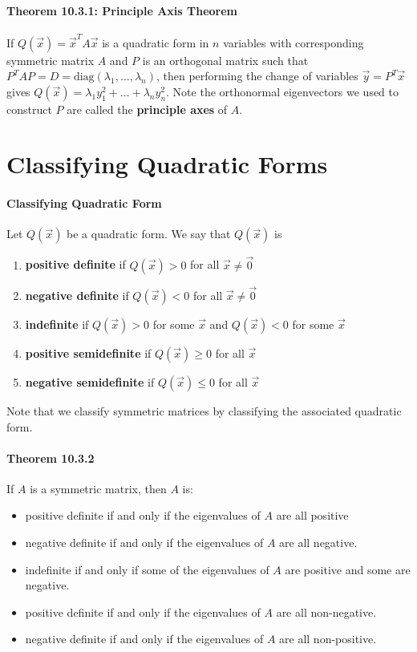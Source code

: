 \documentclass[10pt,letter]{article}
\begin{document}
\paragraph{Theorem 10.3.1: Principle Axis Theorem}
If $Q(\vec{x})=\vec{x}^TA\vec{x}$ is a quadratic form in $n$ variables with corresponding symmetric matrix $A$ and $P$ is an orthogonal matrix such that $P^TAP=D=\text{diag}(\lambda_1,\ldots,\lambda_n)$, then performing the change of variables $\vec{y}=P^T\vec{x}$ gives $Q(\vec{x})=\lambda_1y_1^2+\ldots+\lambda_ny_n^2$. Note the orthonormal eigenvectors we used to construct $P$ are called the \textbf{principle axes} of $A$. 

\section*{Classifying Quadratic Forms}
\paragraph{Classifying Quadratic Form}
Let $Q(\vec{x})$ be a quadratic form. We say that $Q(\vec{x})$ is 
\begin{enumerate}
    \item \textbf{positive definite} if $Q(\vec{x})>0$ for all $\vec{x}\neq\vec{0}$
    \item \textbf{negative definite} if $Q(\vec{x})<0$ for all $\vec{x}\neq\vec{0}$
    \item \textbf{indefinite} if $Q(\vec{x})>0$ for some $\vec{x}$ and $Q(\vec{x})<0$ for some $\vec{x}$
    \item \textbf{positive semidefinite} if $Q(\vec{x})\geq0$ for all $\vec{x}$
    \item \textbf{negative semidefinite} if $Q(\vec{x})\leq0$ for all $\vec{x}$
\end{enumerate}
Note that we classify symmetric matrices by classifying the associated quadratic form. 
\paragraph{Theorem 10.3.2}
If $A$ is a symmetric matrix, then $A$ is: 
\begin{itemize}
    \item positive definite if and only if the eigenvalues of $A$ are all positive
    \item negative definite if and only if the eigenvalues of $A$ are all negative.
    \item indefinite if and only if some of the eigenvalues of $A$ are positive and some are negative.
    \item positive definite if and only if the eigenvalues of $A$ are all non-negative.
    \item negative definite if and only if the eigenvalues of $A$ are all non-positive.
\end{itemize}
\end{document}

